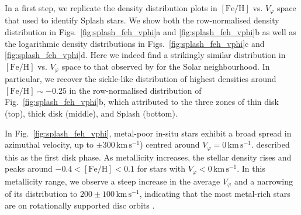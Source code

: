 \documentclass[fleqn,usenatbib]{mnras}
\begin{document}
In a first step, we replicate the density distribution plots in $\mathrm{[Fe/H]}$ vs. $V_\varphi$ space that \citet[][their Fig.~1]{Belokurov2020} used to identify Splash stars. We show both the row-normalised density distribution in Figs.~\ref{fig:splash_feh_vphi}a and \ref{fig:splash_feh_vphi}b as well as the logarithmic density distributions in Figs.~\ref{fig:splash_feh_vphi}c and \ref{fig:splash_feh_vphi}d. Here we indeed find a strikingly similar distribution in $\mathrm{[Fe/H]}$ vs. $V_\varphi$ space to that observed by \citet{Belokurov2020} for the Solar neighbourhood. In particular, we recover the sickle-like distribution of highest densities around $\mathrm{[Fe/H]} \sim -0.25$ in the row-normalised distribution of Fig.~\ref{fig:splash_feh_vphi}b, which \citet{Belokurov2020} attributed to the three zones of thin disk (top), thick disk (middle), and Splash (bottom).

In Fig.~\ref{fig:splash_feh_vphi}, metal-poor in-situ stars exhibit a broad spread in azimuthal velocity, up to $\pm 300\,\mathrm{km\,s^{-1}}$) centred around $V_\varphi = 0\,\mathrm{km\,s^{-1}}$. \citet{Chandra2024} described this as the first disk phase. As metallicity increases, the stellar density rises and peaks around $-0.4 < \mathrm{[Fe/H]} < 0.1$ for stars with $V_\varphi < 0\,\mathrm{km\,s^{-1}}$. In this metallicity range, we observe a steep increase in the average $V_\varphi$ \citep[the second phase according to][]{Chandra2024} and a narrowing of its distribution to $200 \pm 100\,\mathrm{km\,s^{-1}}$, indicating that the most metal-rich stars are on rotationally supported disc orbits \citep[the third phase in][]{Chandra2024}.
\end{document}
